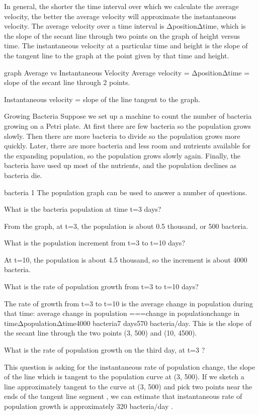 In general, the shorter the time interval over which we calculate the average velocity, the better the average velocity will approximate the instantaneous velocity. The average velocity over a time interval is ΔpositionΔtime, which is the slope of the secant line through two points on the graph of height versus time. The instantaneous velocity at a particular time and height is the slope of the tangent line to the graph at the point given by that time and height.

graph
Average vs Instantaneous Velocity
Average velocity = ΔpositionΔtime = slope of the secant line through 2 points.

Instantaneous velocity = slope of the line tangent to the graph.

Growing Bacteria
Suppose we set up a machine to count the number of bacteria growing on a Petri plate. At first there are few bacteria so the population grows slowly. Then there are more bacteria to divide so the population grows more quickly. Later, there are more bacteria and less room and nutrients available for the expanding population, so the population grows slowly again. Finally, the bacteria have used up most of the nutrients, and the population declines as bacteria die.

 bacteria 1
The population graph can be used to answer a number of questions.

What is the bacteria population at time t=3 days?

From the graph, at t=3, the population is about 0.5 thousand, or 500 bacteria.

What is the population increment from t=3 to t=10 days?

At t=10, the population is about 4.5 thousand, so the increment is about 4000 bacteria.

What is the rate of population growth from t=3 to t=10 days?

The rate of growth from t=3 to t=10 is the average change in population during that time:
average change in population ===\approx   change in populationchange in timeΔpopulationΔtime4000 bacteria7 days570 bacteria/day.
This is the slope of the secant line through the two points (3, 500) and (10, 4500).

What is the rate of population growth on the third day, at t=3 ?

This question is asking for the instantaneous rate of population change, the slope of the line which is tangent to the population curve at (3, 500). If we sketch a line approximately tangent to the curve at (3, 500) and pick two points near the ends of the tangent line segment , we can estimate that instantaneous rate of population growth is approximately 320 bacteria/day .

